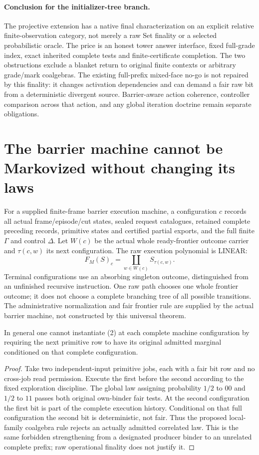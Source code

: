 \documentclass[11pt]{article}
\begin{document}
\paragraph{Conclusion for the initializer-tree branch.} The projective extension has a native final characterization on an explicit relative finite-observation category, not merely a raw Set finality or a selected probabilistic oracle. The price is an honest tower answer interface, fixed full-grade index, exact inherited complete tests and finite-certificate completion. The two obstructions exclude a blanket return to original finite contexts or arbitrary grade/mark coalgebras. The existing full-prefix mixed-face no-go is not repaired by this finality: it changes activation dependencies and can demand a fair raw bit from a deterministic divergent source. Barrier-aware action coherence, controller comparison across that action, and any global iteration doctrine remain separate obligations.


\section{The barrier machine cannot be Markovized without changing its laws}
For a supplied finite-frame barrier execution machine, a configuration $c$ records all actual frame/episode/cut states, sealed request catalogues, retained complete preceding records, primitive states and certified partial exports, and the full finite $\Gamma$ and control $\Delta$. Let $W(c)$ be the actual whole ready-frontier outcome carrier and $\tau(c,w)$ its next configuration. The raw execution polynomial is LINEAR:
\[
 F_M(S)_c=\coprod_{w\in W(c)} S_{\tau(c,w)} .                \tag{9}
\]
Terminal configurations use an absorbing singleton outcome, distinguished from an unfinished recursive instruction. One raw path chooses one whole frontier outcome; it does not choose a complete branching tree of all possible transitions. The administrative normalization and fair frontier rule are supplied by the actual barrier machine, not constructed by this universal theorem.

\begin{proposition}
In general one cannot instantiate (2) at each complete machine configuration by requiring the next primitive row to have its original admitted marginal conditioned on that complete configuration.
\end{proposition}
\begin{proof}
Take two independent-input primitive jobs, each with a fair bit row and no cross-job read permission. Execute the first before the second according to the fixed exploration discipline. The global law assigning probability $1/2$ to $00$ and $1/2$ to $11$ passes both original own-binder fair tests. At the second configuration the first bit is part of the complete execution history. Conditional on that full configuration the second bit is deterministic, not fair. Thus the proposed local-family coalgebra rule rejects an actually admitted correlated law. This is the same forbidden strengthening from a designated producer binder to an unrelated complete prefix; raw operational finality does not justify it.
\end{proof}
\end{document}
